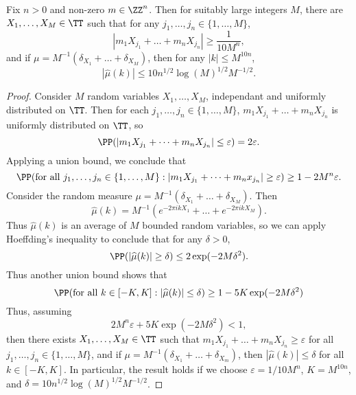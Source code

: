 \begin{theorem}
	Fix $n > 0$ and non-zero $m \in \ZZ^n$. Then for suitably large integers $M$, there are $X_1, \dots, X_M \in \TT$ such that for any $j_1, \dots, j_n \in \{ 1, \dots, M \}$,
	\[ |m_1X_{j_1} + \dots + m_n X_{j_n} | \geq \frac{1}{10 M^n}, \]
	and if $\mu = M^{-1}(\delta_{X_1} + \dots + \delta_{X_M})$, then for any $|k| \leq M^{10n}$,
	\[ |\widehat{\mu}(k)| \leq 10 n^{1/2} \log(M)^{1/2} M^{-1/2}. \]
\end{theorem}
\begin{proof}
	Consider $M$ random variables $X_1, \dots, X_M$, independant and uniformly distributed on $\TT$. Then for each $j_1, \dots, j_n \in \{ 1, \dots, M \}$, $m_1 X_{j_1} + \dots + m_n X_{j_n}$ is uniformly distributed on $\TT$, so
	\[ \PP(|m_1 X_{j_1} + \dots + m_n X_{j_n}| \leq \varepsilon) = 2 \varepsilon. \]
	Applying a union bound, we conclude that
	\[ \PP(\text{for all}\ j_1, \dots, j_n \in \{ 1, \dots, M \}: |m_1 X_{j_1} + \dots + m_n x_{j_n}| \geq \varepsilon ) \geq 1 - 2 M^n \varepsilon. \]
	Consider the random measure $\mu = M^{-1}(\delta_{X_1} + \dots + \delta_{X_M})$. Then
	\[ \widehat{\mu}(k) = M^{-1}(e^{- 2 \pi i k X_1} + \dots + e^{- 2 \pi i k X_M}). \]
	Thus $\widehat{\mu}(k)$ is an average of $M$ bounded random variables, so we can apply Hoeffding's inequality to conclude that for any $\delta > 0$,
	\[ \PP(|\widehat{\mu}(k)| \geq \delta) \leq 2 \exp(- 2 M \delta^2). \]
	Thus another union bound shows that
	\[ \PP(\text{for all}\ k \in [-K,K] : |\widehat{\mu}(k)| \leq \delta) \geq 1 - 5 K \exp(-2 M \delta^2) \]
	Thus, assuming
	\[ 2M^n \varepsilon + 5 K \exp(-2 M \delta^2) < 1, \]
	then there exists $X_1, \dots, X_M \in \TT$ such that $m_1 X_{j_1} + \dots + m_n X_{j_n} \geq \varepsilon$ for all $j_1, \dots, j_n \in \{ 1, \dots, M \}$, and if $\mu = M^{-1}(\delta_{X_1} + \dots + \delta_{X_m})$, then $|\widehat{\mu}(k)| \leq \delta$ for all $k \in [-K,K]$. In particular, the result holds if we choose $\varepsilon = 1/10 M^n$, $K = M^{10n}$, and $\delta = 10 n^{1/2} \log(M)^{1/2} M^{-1/2}$.
\end{proof}


